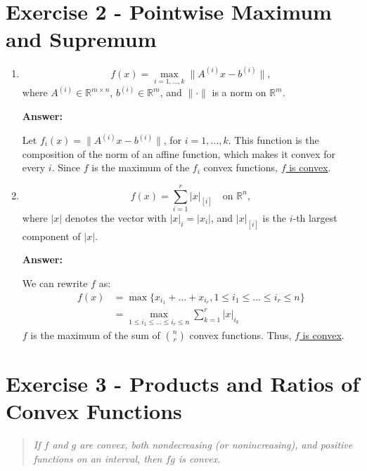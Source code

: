 \documentclass[11pt,a4paper]{article}
\newenvironment{solution}{
  \par\noindent\textbf{Answer:}\vspace{0.3em}
}{\vspace{1em}}
\begin{document}
\section{Exercise 2 - Pointwise Maximum and Supremum}

\begin{enumerate}
\item 
\[
f(x) = \max_{i=1,\dots,k} \| A^{(i)} x - b^{(i)} \|,
\]
where $A^{(i)} \in \mathbb{R}^{m \times n}$, $b^{(i)} \in \mathbb{R}^m$, and $\| \cdot \|$ is a norm on $\mathbb{R}^m$.

\begin{solution}
    Let $f_i (x) = \| A^{(i)} x - b^{(i)}\|$, for $i = 1, \dots, k$. This function is the composition of the norm of an affine function, which makes it convex for every $i$. Since $f$ is the maximum of the $f_i$ convex functions, \underline{$f$ is convex}.
\end{solution}



\item 
\[
f(x) = \sum_{i=1}^r |x|_{[i]} \quad \text{on } \mathbb{R}^n,
\]
where $|x|$ denotes the vector with $|x|_i = |x_i|$, and $|x|_{[i]}$ is the $i$-th largest component of $|x|$.

\begin{solution}
    We can rewrite $f$ as:
    \begin{align*}
        f(x) 
        &= \max \{x_{i_1} + \dots + x_{i_r}, 1 \leq i_1 \leq \dots \leq i_r \leq n \}\\
        &= \max_{1 \leq i_1 \leq \dots \leq i_r \leq n} \sum_{k=1}^r |x|_{i_k}
    \end{align*}
    $f$ is the maximum of the sum of $\binom{n}{r}$ convex functions. Thus, \underline{$f$ is convex}.
\end{solution}

\end{enumerate}


\section{Exercise 3 - Products and Ratios of Convex Functions}
\begin{quote}
\emph{If $f$ and $g$ are convex, both nondecreasing (or nonincreasing), and positive functions on an interval, then $fg$ is convex.}
\end{quote}
\end{document}

